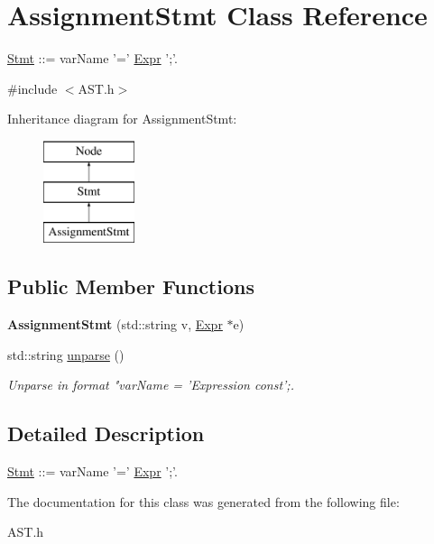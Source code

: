 \hypertarget{classAssignmentStmt}{\section{Assignment\-Stmt Class Reference}
\label{classAssignmentStmt}
}


\hyperlink{classStmt}{Stmt} \-:\-:= var\-Name '=' \hyperlink{classExpr}{Expr} ';'.  




{\ttfamily \#include $<$A\-S\-T.\-h$>$}

Inheritance diagram for Assignment\-Stmt\-:\begin{figure}[H]
\begin{center}
\leavevmode
\includegraphics[height=3.000000cm]{classAssignmentStmt}
\end{center}
\end{figure}
\subsection*{Public Member Functions}
\begin{DoxyCompactItemize}
\item 
\hypertarget{classAssignmentStmt_a17759045b340d16902f645dc617f2a5e}{{\bfseries Assignment\-Stmt} (std\-::string v, \hyperlink{classExpr}{Expr} $\ast$e)}\label{classAssignmentStmt_a17759045b340d16902f645dc617f2a5e}

\item 
\hypertarget{classAssignmentStmt_a892c33dd7fa55fda0f85ced1b5684f98}{std\-::string \hyperlink{classAssignmentStmt_a892c33dd7fa55fda0f85ced1b5684f98}{unparse} ()}\label{classAssignmentStmt_a892c33dd7fa55fda0f85ced1b5684f98}

\begin{DoxyCompactList}\small\item\em Unparse in format "var\-Name = 'Expression const';. \end{DoxyCompactList}\end{DoxyCompactItemize}


\subsection{Detailed Description}
\hyperlink{classStmt}{Stmt} \-:\-:= var\-Name '=' \hyperlink{classExpr}{Expr} ';'. 

The documentation for this class was generated from the following file\-:\begin{DoxyCompactItemize}
\item 
A\-S\-T.\-h\end{DoxyCompactItemize}
